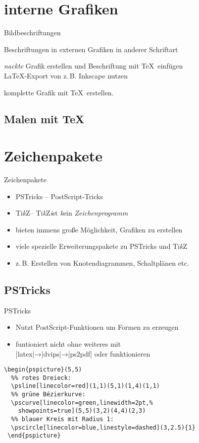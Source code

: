 \documentclass{beamer}
\begin{document}
\section{interne Grafiken}
\begin{frame}{Bildbeschriftungen}
\begin{description}
\item<+->[Problem] Beschriftungen in externen Grafiken in anderer Schriftart
\item<+->[Lösung] \emph{nackte} Grafik erstellen und Beschriftung mit \TeX\ einfügen\\\LaTeX-Export von z.\,B.  Inkscape nutzen
\item<+->[Lösung] komplette Grafik mit \TeX\ erstellen.
\end{description}
\end{frame}

\subsection{Malen mit \TeX}

\section{Zeichenpakete}
\newcommand\TikZ{Ti\emph{k}Z\xspace}
\begin{frame}[fragile]{Zeichenpakete}
	\begin{itemize}
		\item PSTricks – PostScript-Tricks 
		\item \TikZ – \TikZ \emph{i}st \emph{k}ein \emph{Zeichenprogramm}
		\item bieten immens große Möglichkeit, Grafiken zu erstellen
		\item viele spezielle Erweiterungspakete zu PSTricks und \TikZ
		\item z.\,B. Erstellen von Knotendiagrammen, Schaltplänen etc. 
	\end{itemize}
\end{frame}

\subsection{PSTricks}
\begin{frame}[fragile]{PSTricks}
	\begin{itemize}
		\item Nutzt PostScript-Funktionen um Formen zu erzeugen
		\item funtioniert nicht ohne weiteres mit \\
		|latex|→|dvips|→|ps2pdf| oder  funktionieren
	\end{itemize}
\begin{lstlisting}
\begin{pspicture}(5,5)
  %% rotes Dreieck:
  \psline[linecolor=red](1,1)(5,1)(1,4)(1,1)
  %% grüne Bézierkurve:
  \pscurve[linecolor=green,linewidth=2pt,%
    showpoints=true](5,5)(3,2)(4,4)(2,3)
  %% blauer Kreis mit Radius 1:
  \pscircle[linecolor=blue,linestyle=dashed](3,2.5){1}
 \end{pspicture}
\end{lstlisting}
\end{frame}
\end{document}
